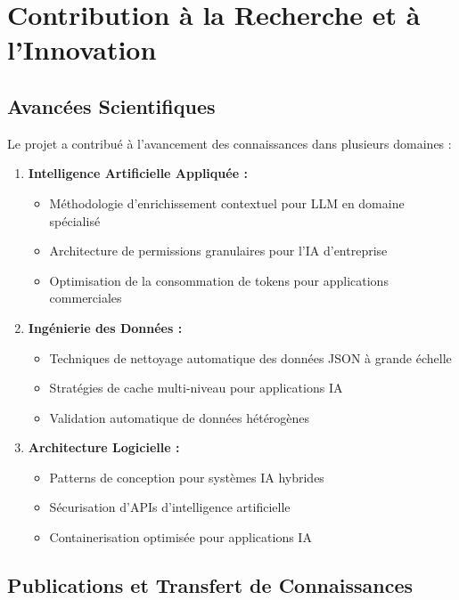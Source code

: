 \section{Contribution à la Recherche et à l'Innovation}

\subsection{Avancées Scientifiques}

Le projet a contribué à l'avancement des connaissances dans plusieurs domaines :

\begin{enumerate}
    \item \textbf{Intelligence Artificielle Appliquée :}
    \begin{itemize}
        \item Méthodologie d'enrichissement contextuel pour LLM en domaine spécialisé
        \item Architecture de permissions granulaires pour l'IA d'entreprise
        \item Optimisation de la consommation de tokens pour applications commerciales
    \end{itemize}
    
    \item \textbf{Ingénierie des Données :}
    \begin{itemize}
        \item Techniques de nettoyage automatique des données JSON à grande échelle
        \item Stratégies de cache multi-niveau pour applications IA
        \item Validation automatique de données hétérogènes
    \end{itemize}
    
    \item \textbf{Architecture Logicielle :}
    \begin{itemize}
        \item Patterns de conception pour systèmes IA hybrides
        \item Sécurisation d'APIs d'intelligence artificielle
        \item Containerisation optimisée pour applications IA
    \end{itemize}
\end{enumerate}

\subsection{Publications et Transfert de Connaissances}

